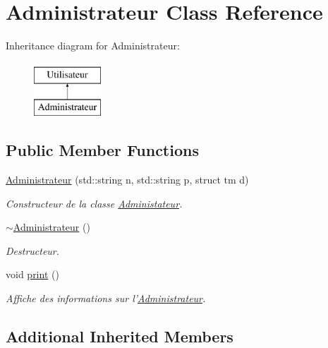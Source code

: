 \hypertarget{classAdministrateur}{\section{Administrateur Class Reference}
\label{classAdministrateur}
}
Inheritance diagram for Administrateur\-:\begin{figure}[H]
\begin{center}
\leavevmode
\includegraphics[height=2.000000cm]{classAdministrateur}
\end{center}
\end{figure}
\subsection*{Public Member Functions}
\begin{DoxyCompactItemize}
\item 
\hyperlink{classAdministrateur_a08dc2614d133d65ffa1913ed85f200fd}{Administrateur} (std\-::string n, std\-::string p, struct tm d)
\begin{DoxyCompactList}\small\item\em Constructeur de la classe \hyperlink{classAdministateur}{Administateur}. \end{DoxyCompactList}\item 
\hyperlink{classAdministrateur_af11ee7b63aabe45c5c2aa0532db1c7db}{$\sim$\-Administrateur} ()
\begin{DoxyCompactList}\small\item\em Destructeur. \end{DoxyCompactList}\item 
\hypertarget{classAdministrateur_a5183b877b2a8aa3d5951e06f453dd622}{void \hyperlink{classAdministrateur_a5183b877b2a8aa3d5951e06f453dd622}{print} ()}\label{classAdministrateur_a5183b877b2a8aa3d5951e06f453dd622}

\begin{DoxyCompactList}\small\item\em Affiche des informations sur l'\hyperlink{classAdministrateur}{Administrateur}. \end{DoxyCompactList}\end{DoxyCompactItemize}
\subsection*{Additional Inherited Members}



